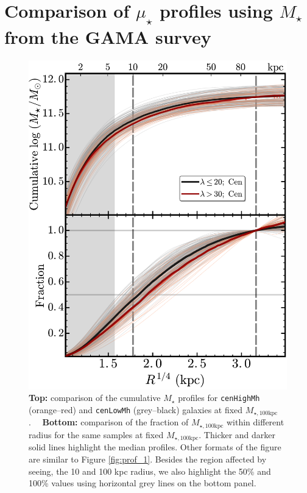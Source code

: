 \documentclass[a4paper,fleqn,usenatbib]{mnras}
\def\rbcg{\texttt{cenHighMh}}
\def\nbcg{\texttt{cenLowMh}}
\def\mstar{{$M_{\star}$}}
\def\mtot{{$M_{\star,100\mathrm{kpc}}$}}
\def\mden{{$\mu_{\star}$}}
\begin{document}
\section{Comparison of \mden{} profiles using \mstar{} from the GAMA survey}
    \label{app:gama} 

\begin{figure}
    \centering
    \includegraphics[width=\columnwidth]{fig/redbcg_prof_m100D}
    \caption{
        \textbf{Top:} comparison of the cumulative \mstar{} profiles for 
        \rbcg{} (orange--red) and \nbcg{} (grey--black) galaxies at fixed \mtot{}.~~
        \textbf{Bottom:} comparison of the fraction of \mtot{} within different radius 
        for the same samples at fixed \mtot{}. 
        Thicker and darker solid lines highlight the median profiles. 
        Other formats of the figure are similar to Figure \ref{fig:prof_1}. 
        Besides the region affected by seeing, the 10 and 100 kpc radius, we 
        also highlight the 50\% and 100\% values using horizontal grey lines on the 
        bottom panel. 
        }
    \label{fig:cog}
\end{figure}
    
\end{document}
